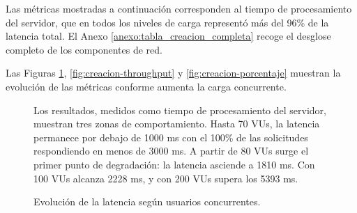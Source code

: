 Las métricas mostradas a continuación corresponden al tiempo de procesamiento del servidor, que en todos los niveles de carga representó más del 96\% de la latencia total. 
El Anexo \ref{anexo:tabla_creacion_completa} recoge el desglose completo de los componentes de red.

Las Figuras \ref{fig:creacion-latencia}, \ref{fig:creacion-throughput} y \ref{fig:creacion-porcentaje} muestran la evolución de las métricas conforme aumenta la carga concurrente.

\begin{figure}[H]
    \centering
    \begin{minipage}{0.55\textwidth}
        \centering
    \end{minipage}
    \hfill
    \begin{minipage}{0.40\textwidth}
        \small
        Los resultados, medidos como tiempo de procesamiento del servidor, muestran tres zonas de comportamiento. Hasta 70 VUs, la latencia permanece por debajo de 1000 ms con el 100\% de las solicitudes respondiendo en menos de 3000 ms. A partir de 80 VUs surge el primer punto de degradación: la latencia asciende a 1810 ms. Con 100 VUs alcanza 2228 ms, y con 200 VUs supera los 5393 ms.
    \end{minipage}
    \caption{Evolución de la latencia según usuarios concurrentes.}
    \label{fig:creacion-latencia}
\end{figure}



